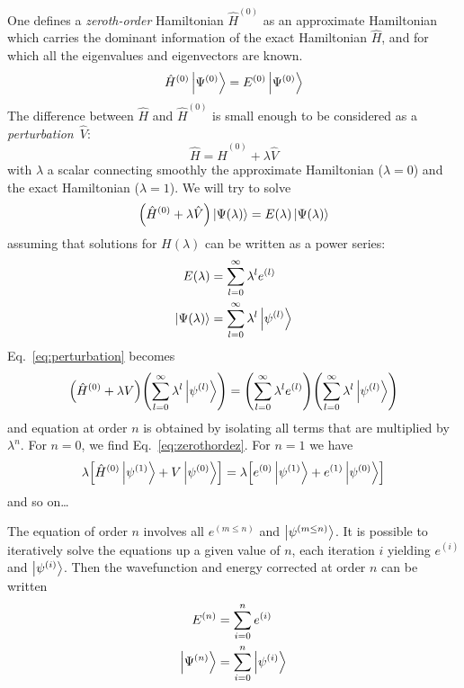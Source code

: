 \documentclass[./thesis.tex]{subfiles}
\begin{document}
One defines a \emph{zeroth-order} Hamiltonian $\hat{H}^{(0)}$ as an approximate Hamiltonian which carries the dominant information of the exact Hamiltonian $\hat{H}$, and for which all the eigenvalues and eigenvectors are known.
\begin{equation}
\label{eq:zerothordez}
\hat{H}^{(0)} \ket {\Psi^{(0)}} = E^{(0)} \ket{\Psi^{(0)}}
\end{equation}
The difference between $\hat{H}$ and
$\hat{H}^{(0)}$ is small enough to be considered as a \emph{perturbation}~$\hat{V}$:
\begin{equation}
\hat{H} = \hat{H}^{(0)} + \lambda \hat{V}
\end{equation}
with $\lambda$ a scalar connecting smoothly the approximate Hamiltonian ($\lambda=0$) and the exact Hamiltonian ($\lambda=1$). We will try to solve
\begin{equation}
\label{eq:perturbation}
\qty(\hat{H}^{(0)} + \lambda \hat{V}) \ket {\Psi (\lambda)} = E(\lambda)\ket {\Psi (\lambda)}
\end{equation}
assuming that solutions for $H(\lambda)$ can be written as a power series:
\begin{align}
E(\lambda) & = \sum_{l=0}^{\infty} \lambda^l e^{(l)}  \\
\ket {\Psi (\lambda)} & = \sum_{l=0}^{\infty} \lambda^l \ket {\psi^{(l)}} 
\end{align}
Eq.~\eqref{eq:perturbation} becomes
\begin{equation}
\qty(\hat{H}^{(0)} + \lambda V) \qty( \sum_{l=0}^{\infty} \lambda^l \ket {\psi^{(l)}} )  = \qty( \sum_{l=0}^{\infty} \lambda^l e^{(l)} ) \qty( \sum_{l=0}^{\infty} \lambda^l \ket {\psi^{(l)}} )
\end{equation}
and equation at order $n$ is obtained by isolating all terms that are multiplied by $\lambda^n$. For $n=0$, we find Eq.~\eqref{eq:zerothordez}. For $n=1$ we have
\begin{equation}
\lambda \qty[ \hat{H}^{(0)} \ket {\psi^{(1)}} + V \ket {\psi^{(0)}} ] = \lambda \qty[ e^{(0)} \ket {\psi^{(1)}} + e^{(1)} \ket {\psi^{(0)}} ]
\end{equation}
and so on\dots

The equation of order $n$ involves all $e^{(m \leq n)}$ and $\ket {\psi^{(m \leq n)}}$. It is possible to iteratively solve the equations up a given value of $n$, each iteration $i$ yielding $e^{(i)}$ and $\ket {\psi^{(i)}}$. Then the wavefunction and energy corrected at order $n$ can be written
\begin{align}
E^{(n)} &=\sum_{i=0}^n e^{(i)} \\
\ket {\Psi^{(n)}} &= \sum_{i=0}^n \ket {\psi^{(i)}}
\end{align}
\end{document}
